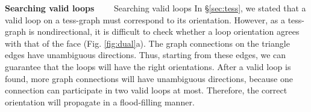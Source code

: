 \vspace{0.5em}
\noindent\textbf{Searching valid loops}~~~~ %
Searching valid loops In \S\ref{sec:tess}, we stated that a valid loop on a tess-graph must correspond to its orientation. However, as a tess-graph is nondirectional, it is difficult to check whether a loop orientation agrees with that of the face (Fig. \ref{fig:dual}a). The graph connections on the triangle edges have unambiguous directions. Thus, starting from these edges, we can guarantee that the loops will have the right orientations. After a valid loop is found, more graph connections will have unambiguous directions, because one connection can participate in two valid loops at most. Therefore, the correct orientation will propagate in a flood-filling manner.

